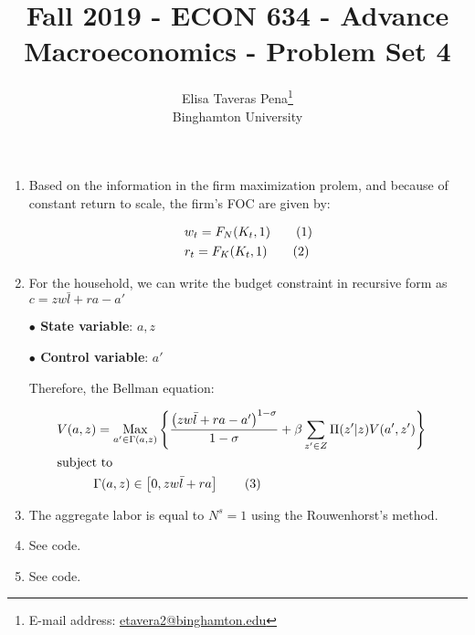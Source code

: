 \documentclass[12pt]{article}%
\newcommand\tab[1][1cm]{\hspace*{#1}}
\DeclareMathOperator*{\Max}{Max}
\newcommand\numberthis{\addtocounter{equation}{1}\tag{\theequation}}
\begin{document}
\title{Fall 2019 - ECON 634 - Advance Macroeconomics - Problem Set 4}
\author{Elisa Taveras Pena\footnote{E-mail address: \href{mailto:etavera2@binghamton.edu}{etavera2@binghamton.edu}  }\\
Binghamton University}
\maketitle

\sloppy%

\onehalfspacing

\begin{enumerate}
	\item Based on the information in the firm maximization prolem, and because of constant return to scale, the firm's FOC are given by:
	
	\begin{align*}
	&w_t= F_N(K_t,1) \numberthis\\
	&r_t= F_K(K_t,1) \numberthis\\
	\end{align*}
	
	\item 	For the household, we can write the budget constraint  in recursive form as  $c=zw\bar{l}+ra-a'$ 
	
	\tab \textbf{ $\bullet$ State variable}: $a,z$ 
	
	\tab \textbf{ $\bullet$ Control variable}: $a'$
	
	
	
	Therefore, the Bellman equation:
	
	\begin{align*}
	&V(a,z)=\Max_{a'\in \Gamma(a,z)} \left\lbrace \frac{\left( zw\bar{l}+ra-a'\right) ^{1-\sigma}}{1-\sigma}+ \beta \sum_{z' \in Z} \Pi(z'|z)V(a',z')\right\rbrace 
	& \notag \\
	&\text{subject to} \notag \\
	& \tab \Gamma(a,z) \in \left[ 0,zw\bar{l}+ra\right] \numberthis\\
	\end{align*} 
	
	\item The aggregate labor is equal to $N^s=1$ using the Rouwenhorst's method. 
	
	\item See code.
	
	\item See code.
	

\end{enumerate}
\end{document}
